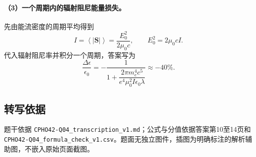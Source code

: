 \paragraph{（3）一个周期内的辐射阻尼能量损失。}
先由能流密度的周期平均得到
\[I=\left\langle|\boldsymbol S|\right\rangle=\frac{E_0^2}{2\mu_0c},\qquad E_0^2=2\mu_0cI.\]
代入辐射阻尼率并积分一个周期，答案写为
\[\frac{\Delta\epsilon}{\epsilon_0}=-\frac{1}{1+\dfrac{2\pi m_e^4c^5}{e^4\mu_0^2I\epsilon_0\lambda}}\approx-40\%.\]
\subsection{转写依据}
题干依据 \texttt{CPHO42-Q04\_transcription\_v1.md}；公式与分值依据答案第10至14页和 \texttt{CPHO42-Q04\_formula\_check\_v1.csv}。题面无独立图件，插图为明确标注的解析辅助图，不嵌入原始页面截图。
